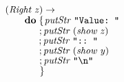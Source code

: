 \documentclass[10pt]{article}
\newcommand{\Conid}[1]{\mathit{#1}}
\newcommand{\Varid}[1]{\mathit{#1}}
\begin{document}
\begin{tabbing}
${\hskip1.00em\relax\phantom{\Varid{interpret}\;\Varid{t}\mathrel{=}\mbox{}}\hskip6.00em\relax(\Conid{Right}\;\Varid{z})\to }$\\
${\hskip1.00em\relax\phantom{\Varid{interpret}\;\Varid{t}\mathrel{=}\mbox{}}\hskip6.00em\relax\hskip2.00em\relax\mathbf{do}\;\{\mskip1.5mu \Varid{putStr}\;\text{\tt \char34 Value:~\char34}}$\\
${\hskip1.00em\relax\phantom{\Varid{interpret}\;\Varid{t}\mathrel{=}\mbox{}}\hskip6.00em\relax\hskip2.00em\relax\phantom{\mathbf{do}\;\mbox{}};\Varid{putStr}\;(\Varid{show}\;\Varid{z})}$\\
${\hskip1.00em\relax\phantom{\Varid{interpret}\;\Varid{t}\mathrel{=}\mbox{}}\hskip6.00em\relax\hskip2.00em\relax\phantom{\mathbf{do}\;\mbox{}};\Varid{putStr}\;\text{\tt \char34 ::~\char34}}$\\
${\hskip1.00em\relax\phantom{\Varid{interpret}\;\Varid{t}\mathrel{=}\mbox{}}\hskip6.00em\relax\hskip2.00em\relax\phantom{\mathbf{do}\;\mbox{}};\Varid{putStr}\;(\Varid{show}\;\Varid{y})}$\\
${\hskip1.00em\relax\phantom{\Varid{interpret}\;\Varid{t}\mathrel{=}\mbox{}}\hskip6.00em\relax\hskip2.00em\relax\phantom{\mathbf{do}\;\mbox{}};\Varid{putStr}\;\text{\tt \char34 \char92 n\char34}}$\\
${\hskip1.00em\relax\phantom{\Varid{interpret}\;\Varid{t}\mathrel{=}\mbox{}}\hskip6.00em\relax\hskip2.00em\relax\phantom{\mathbf{do}\;\mbox{}}\mskip1.5mu\}}$
\end{tabbing}
\end{document}
